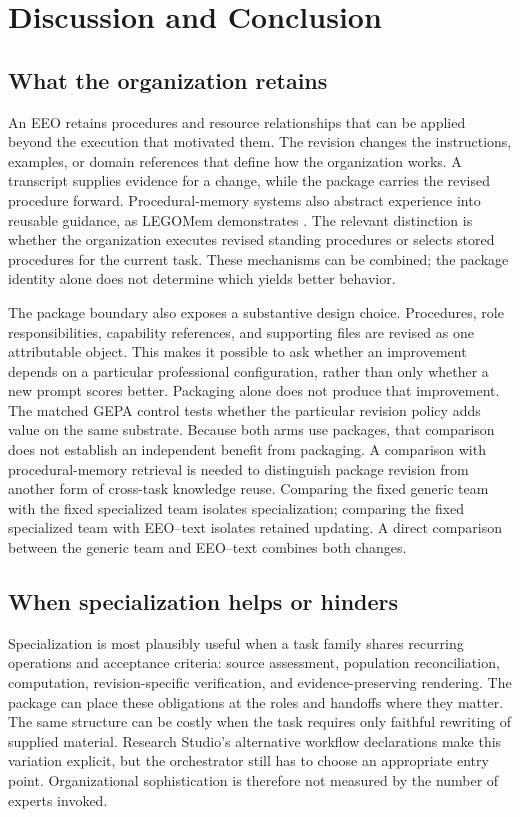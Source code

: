 \section{Discussion and Conclusion}
\subsection{What the organization retains}
An EEO retains procedures and resource relationships that can be applied beyond the execution that motivated them. The revision changes the instructions, examples, or domain references that define how the organization works. A transcript supplies evidence for a change, while the package carries the revised procedure forward. Procedural-memory systems also abstract experience into reusable guidance, as LEGOMem demonstrates \citep{legomem}. The relevant distinction is whether the organization executes revised standing procedures or selects stored procedures for the current task. These mechanisms can be combined; the package identity alone does not determine which yields better behavior.

The package boundary also exposes a substantive design choice. Procedures, role responsibilities, capability references, and supporting files are revised as one attributable object. This makes it possible to ask whether an improvement depends on a particular professional configuration, rather than only whether a new prompt scores better. Packaging alone does not produce that improvement. The matched GEPA control tests whether the particular revision policy adds value on the same substrate. Because both arms use packages, that comparison does not establish an independent benefit from packaging. A comparison with procedural-memory retrieval is needed to distinguish package revision from another form of cross-task knowledge reuse. Comparing the fixed generic team with the fixed specialized team isolates specialization; comparing the fixed specialized team with EEO--text isolates retained updating. A direct comparison between the generic team and EEO--text combines both changes.

\subsection{When specialization helps or hinders}
Specialization is most plausibly useful when a task family shares recurring operations and acceptance criteria: source assessment, population reconciliation, computation, revision-specific verification, and evidence-preserving rendering. The package can place these obligations at the roles and handoffs where they matter. The same structure can be costly when the task requires only faithful rewriting of supplied material. Research Studio's alternative workflow declarations make this variation explicit, but the orchestrator still has to choose an appropriate entry point. Organizational sophistication is therefore not measured by the number of experts invoked.


